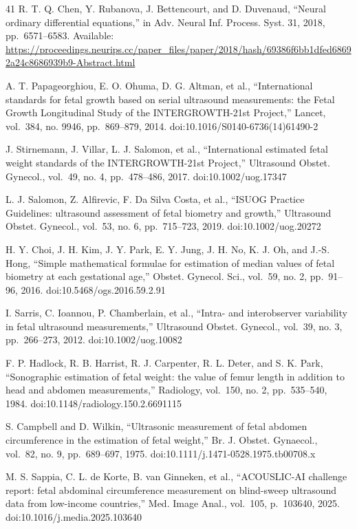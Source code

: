 \documentclass[conference]{IEEEtran}
\begin{document}
\begin{thebibliography}{41}
 R. T. Q. Chen, Y. Rubanova, J. Bettencourt, and D. Duvenaud, ``Neural ordinary differential equations,'' in Adv. Neural Inf. Process. Syst. 31, 2018, pp.~6571--6583. Available: \url{https://proceedings.neurips.cc/paper\_files/paper/2018/hash/69386f6bb1dfed68692a24c8686939b9-Abstract.html}

 A. T. Papageorghiou, E. O. Ohuma, D. G. Altman, et al., ``International standards for fetal growth based on serial ultrasound measurements: the Fetal Growth Longitudinal Study of the INTERGROWTH-21st Project,'' Lancet, vol.~384, no. 9946, pp.~869--879, 2014. doi:10.1016/S0140-6736(14)61490-2

 J. Stirnemann, J. Villar, L. J. Salomon, et al., ``International estimated fetal weight standards of the INTERGROWTH-21st Project,'' Ultrasound Obstet. Gynecol., vol.~49, no. 4, pp.~478--486, 2017. doi:10.1002/uog.17347

 L. J. Salomon, Z. Alfirevic, F. Da Silva Costa, et al., ``ISUOG Practice Guidelines: ultrasound assessment of fetal biometry and growth,'' Ultrasound Obstet. Gynecol., vol.~53, no. 6, pp.~715--723, 2019. doi:10.1002/uog.20272

 H. Y. Choi, J. H. Kim, J. Y. Park, E. Y. Jung, J. H. No, K. J. Oh, and J.-S. Hong, ``Simple mathematical formulae for estimation of median values of fetal biometry at each gestational age,'' Obstet. Gynecol. Sci., vol.~59, no. 2, pp.~91--96, 2016. doi:10.5468/ogs.2016.59.2.91

 I. Sarris, C. Ioannou, P. Chamberlain, et al., ``Intra- and interobserver variability in fetal ultrasound measurements,'' Ultrasound Obstet. Gynecol., vol.~39, no. 3, pp.~266--273, 2012. doi:10.1002/uog.10082

 F. P. Hadlock, R. B. Harrist, R. J. Carpenter, R. L. Deter, and S. K. Park, ``Sonographic estimation of fetal weight: the value of femur length in addition to head and abdomen measurements,'' Radiology, vol.~150, no. 2, pp.~535--540, 1984. doi:10.1148/radiology.150.2.6691115

 S. Campbell and D. Wilkin, ``Ultrasonic measurement of fetal abdomen circumference in the estimation of fetal weight,'' Br. J. Obstet. Gynaecol., vol.~82, no. 9, pp.~689--697, 1975. doi:10.1111/j.1471-0528.1975.tb00708.x

 M. S. Sappia, C. L. de Korte, B. van Ginneken, et al., ``ACOUSLIC-AI challenge report: fetal abdominal circumference measurement on blind-sweep ultrasound data from low-income countries,'' Med. Image Anal., vol.~105, p.~103640, 2025. doi:10.1016/j.media.2025.103640


\end{thebibliography}
\end{document}

